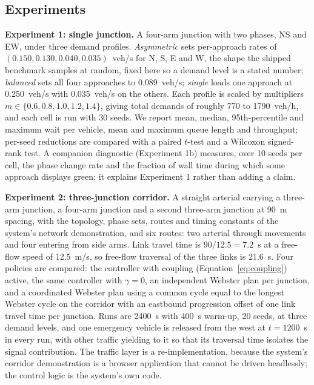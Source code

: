 \documentclass[journal]{IEEEtran}
\begin{document}
\subsection{Experiments}

\textbf{Experiment 1: single junction.} A four-arm junction with two phases, NS and EW, under three
demand profiles. \emph{Asymmetric} sets per-approach rates of $(0.150, 0.130, 0.040, 0.035)$~veh/s for
N, S, E and W, the shape the shipped benchmark samples at random, fixed here so a demand level is a
stated number; \emph{balanced} sets all four approaches to 0.089~veh/s; \emph{single} loads one approach
at 0.250~veh/s with 0.035~veh/s on the others. Each profile is scaled by multipliers
$m \in \{0.6, 0.8, 1.0, 1.2, 1.4\}$, giving total demands of roughly 770 to 1790~veh/h, and each cell is
run with 30 seeds. We report mean, median, 95th-percentile and maximum wait per vehicle, mean and
maximum queue length and throughput; per-seed reductions are compared with a paired $t$-test and a
Wilcoxon signed-rank test. A companion diagnostic (Experiment 1b) measures, over 10 seeds per cell, the
phase change rate and the fraction of wall time during which some approach displays green; it explains
Experiment 1 rather than adding a claim.

\textbf{Experiment 2: three-junction corridor.} A straight arterial carrying a three-arm junction, a
four-arm junction and a second three-arm junction at 90~m spacing, with the topology, phase sets, routes
and timing constants of the system's network demonstration, and six routes: two arterial through
movements and four entering from side arms. Link travel time is $90/12.5 = 7.2$~s at a free-flow speed of
12.5~m/s, so free-flow traversal of the three links is 21.6~s. Four policies are compared: the controller
with coupling (Equation~\eqref{eq:coupling}) active, the same controller with $\gamma = 0$, an independent
Webster plan per junction, and a coordinated Webster plan using a common cycle equal to the longest
Webster cycle on the corridor with an eastbound progression offset of one link travel time per junction.
Runs are 2400~s with 400~s warm-up, 20 seeds, at three demand levels, and one emergency vehicle is
released from the west at $t = 1200$~s in every run, with other traffic yielding to it so that its
traversal time isolates the signal contribution. The traffic layer is a re-implementation, because the
system's corridor demonstration is a browser application that cannot be driven headlessly; the control
logic is the system's own code.
\end{document}
